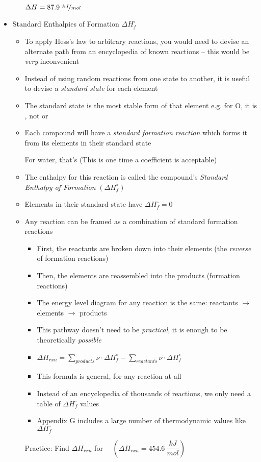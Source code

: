 \documentclass[12pt, openany, letterpaper]{memoir}
\begin{document}
\begin{itemize}
\begin{itemize}
            \hspace{2em} $\Delta H = 87.9~\nicefrac{kJ}{mol}$
  \end{itemize}
  \item Standard Enthalpies of Formation $\Delta H_{f}^\circ$
    \begin{itemize}
      \item To apply Hess's law to arbitrary reactions, you would need to devise an alternate path from an encyclopedia of known reactions -- this would be \emph{very} inconvenient
      \item Instead of using random reactions from one state to another, it is useful to devise a \emph{standard state} for each element
      \item The standard state is the most stable form of that element e.g. for O, it is , not  or 
      \item Each compound will have a \emph{standard formation reaction} which forms it from its elements in their standard state

            For water, that's  \hspace{1em} (This is one time a  coefficient is acceptable)
      \item The enthalpy for this reaction is called the compound's \emph{Standard Enthalpy of Formation} $\left(\Delta H^\circ_f\right)$
      \item Elements in their standard state have $\Delta H^\circ_f = 0$
      \item Any reaction can be framed as a combination of standard formation reactions
        \begin{itemize}
          \item First, the reactants are broken down into their elements (the \emph{reverse} of formation reactions)
          \item Then, the elements are reassembled into the products (formation reactions)
          \item The energy level diagram for any reaction is the same: reactants $\rightarrow$ elements $\rightarrow$ products
          \item This pathway doesn't need to be \emph{practical}, it is enough to be theoretically \emph{possible}
          \item $\Delta H_{rxn}=\sum\limits_{products}\nu\cdot\Delta H^\circ_f - \sum\limits_{reactants}\nu\cdot\Delta H^\circ_f$
          \item This formula is general, for any reaction at all
          \item Instead of an encyclopedia of thousands of reactions, we only need a table of $\Delta H^\circ_f$ values
          \item Appendix G includes a large number of thermodynamic values like $\Delta H^\circ_f$
        \end{itemize}
        Practice: Find $\Delta H_{rxn}$ for~~  \hspace{1em} $\left(\Delta H_{rxn}=454.6~\dfrac{kJ}{mol}\right)$


\end{itemize}
\end{itemize}
\end{document}
